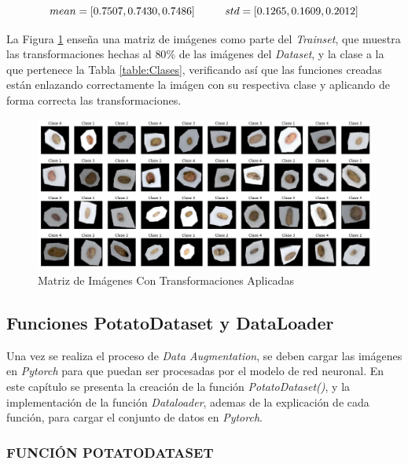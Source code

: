 			\begin{equation}
				{mean = [0.7507, 0.7430, 0.7486] \hspace*{1cm}  std  = [0.1265, 0.1609, 0.2012]}
				\label{eq:meanstd2}
			\end{equation}

			La Figura \ref{fig:agumentation} enseña una matriz de imágenes como parte del \textit{Trainset}, que muestra las transformaciones hechas al $80\%$ de las imágenes del \textit{Dataset}, y la clase a la que pertenece la Tabla \ref{table:Clases}, verificando así que las funciones creadas están enlazando correctamente la imágen con su respectiva clase y aplicando de forma correcta las transformaciones.

			
			\begin{figure}[ht]
				\centering
				\includegraphics[scale=0.4]{Figs/augmentation.png}
				\caption{Matriz de Imágenes Con Transformaciones Aplicadas}
				\label{fig:agumentation}
			\end{figure}	

		\subsection{Funciones PotatoDataset y DataLoader}
		
		Una vez se realiza el proceso de \textit{Data Augmentation}, se deben cargar las imágenes en \textit{Pytorch} para que puedan ser procesadas por el modelo de red neuronal. En este capítulo se presenta la creación de la función \textit{PotatoDataset()}, y la implementación de la función \textit{Dataloader}, ademas de la explicación de cada función, para cargar el conjunto de datos en \textit{Pytorch}.
		
		
			\subsubsection{FUNCIÓN POTATODATASET}
			
